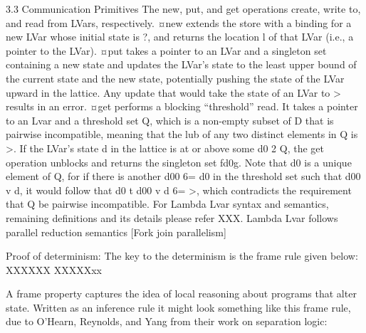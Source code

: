 \documentclass[twocolumn]{article}
\begin{document}
3.3 Communication Primitives
The new, put, and get operations create, write to, and read from LVars, respectively. 
¤new extends the store with a binding for a new LVar whose initial state is ?, and returns the location l of that LVar (i.e., a pointer to the LVar).
¤put takes a pointer to an LVar and a singleton set containing a new state and updates the LVar’s state to the least upper bound of the current state and the new state, potentially pushing the state of the LVar upward in the lattice. Any update that would take the state of an LVar to > results in an error.
¤get performs a blocking “threshold” read. It takes a pointer to an Lvar and a threshold set Q, which is a non-empty subset of D that is pairwise incompatible, meaning that the lub of any two distinct elements in Q is >. If the LVar’s state d in the lattice is at or above some d0 2 Q, the get operation unblocks and returns the singleton set fd0g. Note that d0 is a unique element of Q, for if there is another d00 6= d0 in the threshold set such that d00 v d, it would follow that d0 t d00 v d 6= >, which contradicts the requirement that Q be pairwise incompatible.
For Lambda Lvar syntax and semantics, remaining definitions and its details please refer XXX. Lambda Lvar follows parallel reduction semantics [Fork join parallelism]

Proof of determinism: The key to the determinism is the frame rule given below:
XXXXXX
XXXXXxx

A frame property captures the idea of local reasoning about programs that alter state. Written as an inference rule it might look something like this frame rule, due to O’Hearn, Reynolds, and Yang from their work on separation logic: 
\end{document}
